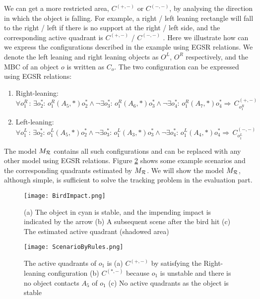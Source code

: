 \documentclass[letterpaper]{article}
\begin{document}
We can get a more restricted area, $C^{(+,-)}$ or $C^{(-,-)}$, by analysing the direction in which the object is falling. For example, a right / left leaning rectangle will fall to the right / left if there is no support at the right / left side, and the corresponding active quadrant is $C^{(+,-)}$ / $C^{(-, -)}$%
. Here we illustrate how can we express the configurations described in the example using EGSR relations. We denote the left leaning and right leaning objects as $O^L$, $O^R$ respectively, and the MBC of an object $o$ is written as $C_{o}$. The two configuration can be expressed using EGSR relations:
\begin{enumerate}
\item Right-leaning: $\forall o^R_1\,:\, \exists o^*_2:\,o^R_1 (A_5, *) o^*_2 \wedge\neg\exists o^*_3:\,o^R_1 (A_6, *) o^*_3 \wedge\neg\exists o^*_4:\,o^R_1 (A_7, *) o^*_4 \Rightarrow \, C_{o^R_1}^{(+,-)}$

\item Left-leaning: $\forall o^L_1\,:\, \exists o^*_2:\,o^L_1 (A_5, *) o^*_2 \wedge\neg\exists o^*_3:\,o^L_1 (A_3, *) o^*_3 \wedge\neg\exists o^*_4:\,o^L_1 (A_4, *) o^*_4 \Rightarrow \, C_{o^L_1}^{(-,-)}$
\end{enumerate}
The model $M_{\cal{R}}$ contains all such configurations and can be replaced with any other model using EGSR relations. Figure \ref{ScenarioByRules} shows some example scenarios and the corresponding quadrants estimated by $M_{\cal{R}}$. We will show the model $M_{\cal{R}}$, although simple, is sufficient to solve the tracking problem in the evaluation part.  




\begin{figure}[h!]
\centering\texttt{[image: BirdImpact.png]}\caption{(a) The object in cyan is stable, and the impending impact is indicated by the arrow (b) A subsequent scene after the bird hit (c) The estimated active quadrant (shadowed area)}
\label{BirdImpact}
\end{figure}

\begin{figure}[h!]
\centering\texttt{[image: ScenarioByRules.png]}\caption{ The active quadrants of $o_1$ is (a)  $C^{(+,-)}$ by satisfying the Right-leaning configuration (b) $C^{(*,-)}$ because $o_1$ is unstable and there is no object contacts $A_5$ of $o_1$ (c) No active quadrants as the object is stable}
\label{ScenarioByRules}
\end{figure}
\end{document}
